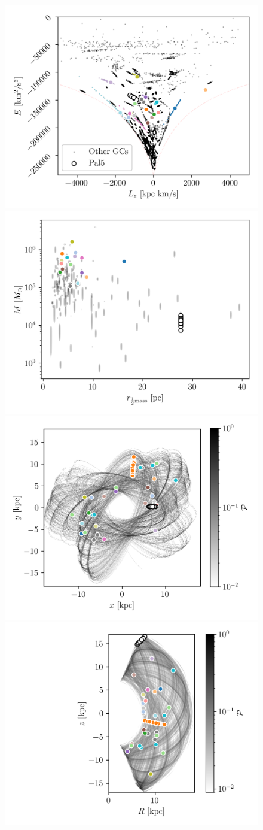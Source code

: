         \begin{figure}
            \centering
            \includegraphics[width=0.45\linewidth]{images/E_Lz_perturbers.png}
            \includegraphics[width=0.45\linewidth]{images/mass_size_plane.png}
            \includegraphics[width=0.45\linewidth]{images/impact_stats_phase_space_xy.png}
            \includegraphics[width=0.45\linewidth]{images/impact_stats_phase_space.png}

\end{figure}
